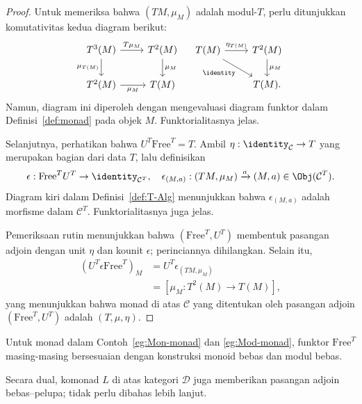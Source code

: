 \begin{proof}
	Untuk memeriksa bahwa $(TM,\mu_M)$ adalah modul-$T$, perlu ditunjukkan
	komutativitas kedua diagram berikut:
	\[\begin{tikzcd}
		T^3 (M) \arrow[r, "T\mu_M"] \arrow[d, "\mu_{T(M)}"'] & T^2(M) \arrow[d, "\mu_M"] \\
		T^2 (M) \arrow[r, "\mu_M"'] & T(M)
	\end{tikzcd} \quad \begin{tikzcd}
		T(M) \arrow[r, "\eta_{T(M)}"] \arrow[rd, "\identity"'] & T^2(M) \arrow[d, "\mu_M"] \\
		& T(M).
	\end{tikzcd}\]
	Namun, diagram ini diperoleh dengan mengevaluasi diagram funktor dalam
	Definisi~\ref{def:monad} pada objek $M$. Funktorialitasnya jelas.

	Selanjutnya, perhatikan bahwa $U^T\mathrm{Free}^T=T$. Ambil
	$\eta:\identity_{\mathcal{C}}\to T$ yang merupakan bagian dari data $T$, lalu
	definisikan
	\[ \epsilon: \mathrm{Free}^T U^T \to \identity_{\mathcal{C}^T}, \quad
	\epsilon_{(M, a)}: (TM, \mu_M) \xrightarrow{a} (M, a) \in \Obj(\mathcal{C}^T). \]
	Diagram kiri dalam Definisi~\ref{def:T-Alg} menunjukkan bahwa
	$\epsilon_{(M,a)}$ adalah morfisme dalam $\mathcal{C}^T$.
	Funktorialitasnya juga jelas.

	Pemeriksaan rutin menunjukkan bahwa $(\mathrm{Free}^T,U^T)$ membentuk
	pasangan adjoin dengan unit $\eta$ dan kounit $\epsilon$; perinciannya
	dihilangkan. Selain itu,
	\begin{equation*}\begin{aligned}
		\left(U^T \epsilon \mathrm{Free}^T\right)_M & = U^T \epsilon_{(TM, \mu_M)} \\
		& = \left[ \mu_M: T^2(M) \to T(M)\right],
	\end{aligned}\end{equation*}
	yang menunjukkan bahwa monad di atas $\mathcal{C}$ yang ditentukan oleh
	pasangan adjoin $(\mathrm{Free}^T,U^T)$ adalah $(T,\mu,\eta)$.
\end{proof}

Untuk monad dalam Contoh~\ref{eg:Mon-monad} dan
\ref{eg:Mod-monad}, funktor $\mathrm{Free}^T$ masing-masing bersesuaian dengan
konstruksi monoid bebas dan modul bebas.

Secara dual, komonad $L$ di atas kategori $\mathcal{D}$ juga memberikan
pasangan adjoin bebas--pelupa; tidak perlu dibahas lebih lanjut.
